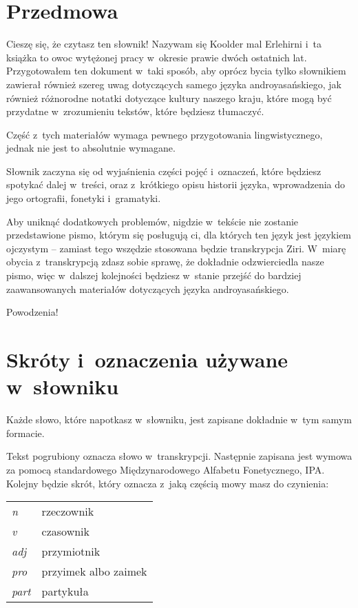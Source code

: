 \newpage

\section{Przedmowa}

\begin{spacing}{1.1}

Cieszę się, że czytasz ten słownik! Nazywam się Koolder mal Erlehirni i~ta książka to owoc wytężonej pracy w~okresie prawie dwóch ostatnich lat. Przygotowałem ten dokument w~taki sposób, aby oprócz bycia tylko słownikiem zawierał również szereg uwag dotyczących samego języka androyasańskiego, jak również różnorodne notatki dotyczące kultury naszego kraju, które mogą być przydatne w~zrozumieniu tekstów, które będziesz tłumaczyć.

Część z~tych materiałów wymaga pewnego przygotowania lingwistycznego, jednak nie jest to absolutnie wymagane.

Słownik zaczyna się od wyjaśnienia części pojęć i~oznaczeń, które będziesz spotykać dalej w~treści, oraz z~krótkiego opisu historii języka, wprowadzenia do jego ortografii, fonetyki i~gramatyki.

Aby uniknąć dodatkowych problemów, nigdzie w~tekście nie zostanie przedstawione pismo, którym się posługują ci, dla których ten język jest językiem ojczystym – zamiast tego wszędzie stosowana będzie transkrypcja Ziri. W~miarę obycia z~transkrypcją zdasz sobie sprawę, że dokładnie odzwierciedla nasze pismo, więc w~dalszej kolejności będziesz w~stanie przejść do bardziej zaawansowanych materiałów dotyczących języka androyasańskiego.

\bigskip

Powodzenia!

\section[Skróty i~oznaczenia]{Skróty i~oznaczenia używane w~słowniku}

Każde słowo, które napotkasz w~słowniku, jest zapisane dokładnie w~tym samym formacie.

Tekst pogrubiony oznacza słowo w~transkrypcji. Następnie zapisana jest wymowa za pomocą standardowego Międzynarodowego Alfabetu Fonetycznego, IPA. Kolejny będzie skrót, który oznacza z~jaką częścią mowy masz do czynienia:

\begin{table}[h]
\begin{tabular}{ll}
\emph{n}    & rzeczownik           \\
\emph{v}    & czasownik            \\
\emph{adj}  & przymiotnik          \\
\emph{pro}  & przyimek albo zaimek \\
\emph{part} & partykuła           
\end{tabular}
\end{table}


\end{spacing}
